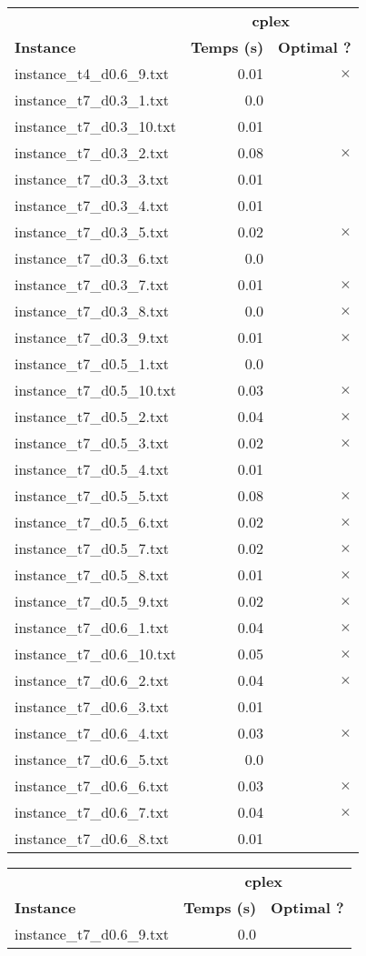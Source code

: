 \documentclass{article}
\begin{document}
\newpage
\begin{center}
\renewcommand{\arraystretch}{1.4}
 \begin{tabular}{lrr}
	\hline
 & \multicolumn{2}{c}{\textbf{cplex}}\\
\textbf{Instance}  & \textbf{Temps (s)} & \textbf{Optimal ?} \\\hline

instance\_t4\_d0.6\_9.txt & 0.01 & 
$\times$
\\
instance\_t7\_d0.3\_1.txt & 0.0 & 
\\
instance\_t7\_d0.3\_10.txt & 0.01 & 
\\
instance\_t7\_d0.3\_2.txt & 0.08 & 
$\times$
\\
instance\_t7\_d0.3\_3.txt & 0.01 & 
\\
instance\_t7\_d0.3\_4.txt & 0.01 & 
\\
instance\_t7\_d0.3\_5.txt & 0.02 & 
$\times$
\\
instance\_t7\_d0.3\_6.txt & 0.0 & 
\\
instance\_t7\_d0.3\_7.txt & 0.01 & 
$\times$
\\
instance\_t7\_d0.3\_8.txt & 0.0 & 
$\times$
\\
instance\_t7\_d0.3\_9.txt & 0.01 & 
$\times$
\\
instance\_t7\_d0.5\_1.txt & 0.0 & 
\\
instance\_t7\_d0.5\_10.txt & 0.03 & 
$\times$
\\
instance\_t7\_d0.5\_2.txt & 0.04 & 
$\times$
\\
instance\_t7\_d0.5\_3.txt & 0.02 & 
$\times$
\\
instance\_t7\_d0.5\_4.txt & 0.01 & 
\\
instance\_t7\_d0.5\_5.txt & 0.08 & 
$\times$
\\
instance\_t7\_d0.5\_6.txt & 0.02 & 
$\times$
\\
instance\_t7\_d0.5\_7.txt & 0.02 & 
$\times$
\\
instance\_t7\_d0.5\_8.txt & 0.01 & 
$\times$
\\
instance\_t7\_d0.5\_9.txt & 0.02 & 
$\times$
\\
instance\_t7\_d0.6\_1.txt & 0.04 & 
$\times$
\\
instance\_t7\_d0.6\_10.txt & 0.05 & 
$\times$
\\
instance\_t7\_d0.6\_2.txt & 0.04 & 
$\times$
\\
instance\_t7\_d0.6\_3.txt & 0.01 & 
\\
instance\_t7\_d0.6\_4.txt & 0.03 & 
$\times$
\\
instance\_t7\_d0.6\_5.txt & 0.0 & 
\\
instance\_t7\_d0.6\_6.txt & 0.03 & 
$\times$
\\
instance\_t7\_d0.6\_7.txt & 0.04 & 
$\times$
\\
instance\_t7\_d0.6\_8.txt & 0.01 & 
\\
\hline\end{tabular}
\end{center}

\newpage
\begin{center}
\renewcommand{\arraystretch}{1.4}
 \begin{tabular}{lrr}
	\hline
 & \multicolumn{2}{c}{\textbf{cplex}}\\
\textbf{Instance}  & \textbf{Temps (s)} & \textbf{Optimal ?} \\\hline

instance\_t7\_d0.6\_9.txt & 0.0 & 
\\
\hline\end{tabular}
\end{center}
\end{document}
